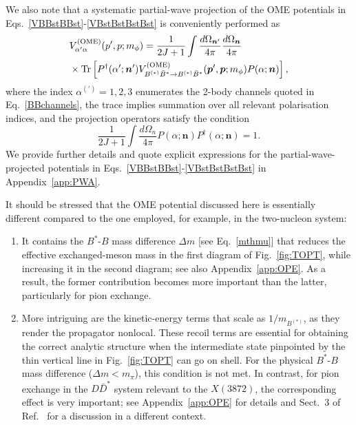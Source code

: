 \documentclass[aps,prd,showpacs,amsmath,twocolumn,superscriptaddress,floatfix,nofootinbib,notitlepage]{revtex4-2}
\newcommand{\vep}{{\bm p}}
\newcommand{\be}{\begin{equation}}
\newcommand{\ee}{\end{equation}}
\newcommand{\ven}{{\bm n}}
\newcommand{\X}{X(3872)}
\newcommand{\VOME}{V^{\rm (OME)}}
\begin{document}
We also note that a systematic partial-wave projection 
of the OME potentials in Eqs.~\eqref{VBBstBBst}-\eqref{VBstBstBstBst} is conveniently performed as~\cite{Baru:2016iwj,Baru:2017gwo,Baru:2019xnh}
\begin{align}
&\VOME_{\alpha'\alpha}(p',p;m_\phi)= \frac{1}{2J+1}
\int\frac{d\Omega_{\ven'}}{4\pi}
\frac{d\Omega_{\ven}}{4\pi}
\label{VPWA}\\
&\times\mbox{Tr}\left[
P^\dagger(\alpha';\ven')
\VOME_{B^{(*)}\bar{B}^*\to B^{(*)}\bar{B}^*}
 (\vep',\vep;m_\phi)P(\alpha;\ven)\right],
\notag
\end{align}
where the index $\alpha^{(\prime)}=1,2,3$ enumerates the 2-body channels quoted in Eq.~\eqref{BBchannels}, the trace implies summation over all relevant polarisation indices,
and the projection operators satisfy the condition
\be
\frac1{2J+1}\int\frac{d\Omega_n}{4\pi}P(\alpha;\ven)P^\dagger(\alpha;\ven)=1.
\label{Pnorm}
\ee
We provide further details and quote explicit expressions for the partial-wave-projected potentials in Eqs.~\eqref{VBBstBBst}-\eqref{VBstBstBstBst} in Appendix~\ref{app:PWA}.

It should be stressed that the OME potential discussed here is essentially different compared to the one employed, for example, in the two-nucleon system:
\begin{enumerate}
\item It contains the $B^*$-$B$ mass difference $\Delta m$ [see Eq.~\eqref{mthmu}] that reduces the effective exchanged-meson mass in the first diagram of Fig.~\ref{fig:TOPT}, while increasing it in the second diagram; see also Appendix~\ref{app:OPE}. As a result, the former contribution becomes more important than the latter, particularly for pion exchange.
\item More intriguing are the kinetic-energy terms that scale as $1/m_{B^{(*)}}$, as they render the propagator nonlocal. These recoil terms are essential for obtaining the correct analytic structure when the intermediate state pinpointed by the thin vertical line in Fig.~\ref{fig:TOPT} can go on shell. For the physical $B^*$-$B$ mass difference ($\Delta m<m_\pi$), this condition is not met. In contrast, for pion exchange in the $D\bar{D}^*$ system relevant to the $ \X$, the corresponding effect is very important; see Appendix~\ref{app:OPE} for details and Sect.~3 of Ref.~\cite{Lensky:2005hb} for a discussion in a different context.
\end{enumerate}
\end{document}
